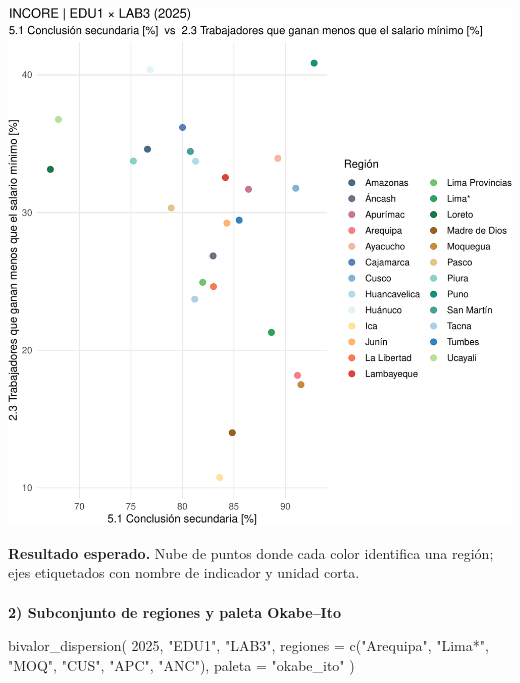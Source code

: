 \documentclass[
  11pt,
  letterpaper,
  DIV=11,
  numbers=noendperiod]{scrartcl}
\makeatletter
\let\oldparagraph\paragraph
\renewcommand{\paragraph}{
    \@ifstar
      \xxxParagraphStar
      \xxxParagraphNoStar
  }
\newcommand{\xxxParagraphStar}[1]{\oldparagraph*{#1}\mbox{}}
\newcommand{\xxxParagraphNoStar}[1]{\oldparagraph{#1}\mbox{}}
\newenvironment{Shaded}{\begin{snugshade}}{\end{snugshade}}
\newcommand{\AttributeTok}[1]{\textcolor[rgb]{0.40,0.45,0.13}{#1}}
\newcommand{\DecValTok}[1]{\textcolor[rgb]{0.68,0.00,0.00}{#1}}
\newcommand{\FunctionTok}[1]{\textcolor[rgb]{0.28,0.35,0.67}{#1}}
\newcommand{\NormalTok}[1]{\textcolor[rgb]{0.00,0.23,0.31}{#1}}
\newcommand{\StringTok}[1]{\textcolor[rgb]{0.13,0.47,0.30}{#1}}
\makeatother
\begin{document}
\includegraphics{Manual_files/figure-pdf/unnamed-chunk-109-1.pdf}

\textbf{Resultado esperado.} Nube de puntos donde cada color identifica
una región; ejes etiquetados con nombre de indicador y unidad corta.

\paragraph{\texorpdfstring{\textbf{2) Subconjunto de regiones y paleta
Okabe--Ito}}{2) Subconjunto de regiones y paleta Okabe--Ito}}\label{subconjunto-de-regiones-y-paleta-okabeito}

\begin{Shaded}
\begin{Highlighting}[]
\FunctionTok{bivalor\_dispersion}\NormalTok{(}
  \DecValTok{2025}\NormalTok{, }\StringTok{"EDU1"}\NormalTok{, }\StringTok{"LAB3"}\NormalTok{,}
  \AttributeTok{regiones =} \FunctionTok{c}\NormalTok{(}\StringTok{"Arequipa"}\NormalTok{, }\StringTok{"Lima*"}\NormalTok{, }\StringTok{"MOQ"}\NormalTok{,}
               \StringTok{"CUS"}\NormalTok{, }\StringTok{"APC"}\NormalTok{, }\StringTok{"ANC"}\NormalTok{),}
  \AttributeTok{paleta   =} \StringTok{"okabe\_ito"}
\NormalTok{)}
\end{Highlighting}
\end{Shaded}
\end{document}

